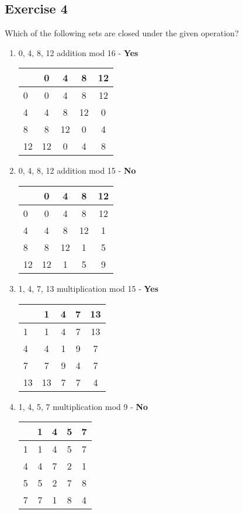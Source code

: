 \documentclass{article}
\newcommand\ssc[2][\DefaultOpt]{%
  \def\DefaultOpt{#2}%
  \subsection[#1]{#2}%
}
\newcommand{\balist}{\begin{enumerate}[label=\alph*.]}
\newcommand{\elist}{\end{enumerate}}
\begin{document}
\ssc{Exercise 4}{
Which of the following sets are closed under the given operation?
\balist
\item {0, 4, 8, 12} addition mod 16 - \textbf{Yes}

\begin{tabular}{l|cccc}
  & 0 & 4 & 8 & 12 \\
  \hline
  0 & 0 & 4 & 8 & 12 \\
  4 & 4 & 8 & 12 & 0 \\
  8 & 8 & 12 & 0 & 4 \\
  12 & 12 & 0 & 4 & 8
\end{tabular}

\item {0, 4, 8, 12} addition mod 15 - \textbf{No}

\begin{tabular}{l|cccc}
  & 0 & 4 & 8 & 12 \\
  \hline
  0 & 0 & 4 & 8 & 12 \\
  4 & 4 & 8 & 12 & 1 \\
  8 & 8 & 12 & 1 & 5 \\
  12 & 12 & 1 & 5 & 9
\end{tabular}

\item {1, 4, 7, 13} multiplication mod 15 - \textbf{Yes}

\begin{tabular}{l|cccc}
  & 1 & 4 & 7 & 13 \\
  \hline
  1 & 1 & 4 & 7 & 13 \\
  4 & 4 & 1 & 9 & 7 \\
  7 & 7 & 9 & 4 & 7 \\
  13 & 13 & 7 & 7 & 4
\end{tabular}

\item {1, 4, 5, 7} multiplication mod 9 - \textbf{No}

\begin{tabular}{l|cccc}
  & 1 & 4 & 5 & 7 \\
  \hline
  1 & 1 & 4 & 5 & 7 \\
  4 & 4 & 7 & 2 & 1 \\
  5 & 5 & 2 & 7 & 8 \\
  7 & 7 & 1 & 8 & 4
\end{tabular}

\elist

}
\end{document}
